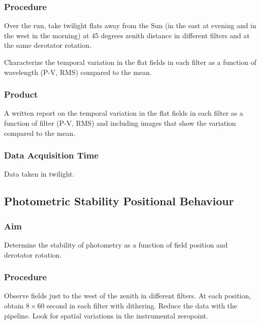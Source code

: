\documentclass{article}
\begin{document}
\subsubsection{Procedure}

Over the run, take twilight flats away from the Sun (in the east at evening and in the west in the morning) at 45 degrees zenith distance in different filters and at the same derotator rotation.

Characterize the temporal variation in the flat fields in each filter as a function of wavelength (P-V, RMS) compared to the mean.

\subsubsection{Product}

A written report on the temporal variation in the flat fields in each filter as a function of filter (P-V, RMS) and including images that show the variation compared to the mean.

\subsubsection{Data Acquisition Time}

Data taken in twilight.


\subsection{Photometric Stability Positional Behaviour}

\subsubsection{Aim}

Determine the stability of photometry as a function of field position and derotator rotation.

\subsubsection{Procedure}

Observe fields just to the west of the zenith in different filters. At each position, obtain $8 \times 60$ second in each filter with dithering. Reduce the data with the pipeline. Look for spatial variations in the instrumental zeropoint.
\end{document}
